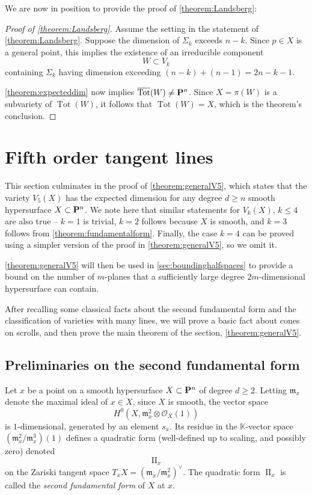 \documentclass[12pt,reqno]{amsart}
\theoremstyle{plain}
\theoremstyle{remark}
\numberwithin{equation}{section}
\renewcommand{\k}{k}
\DeclareMathOperator{\II}{II}
\DeclareMathOperator{\Tot}{Tot}
\renewcommand {\P}{{\bf P}}
\numberwithin{equation}{section}
\renewcommand{\O}{\mathcal O}
\renewcommand{\k}{\mathbb K}
\begin{document}
We are now in position to provide the proof of
\autoref{theorem:Landsberg}:

\begin{proof}[Proof of \autoref{theorem:Landsberg}]
  Assume the setting in the statement of
  \autoref{theorem:Landsberg}. Suppose the dimension of $\Sigma_{k}$
  exceeds $n-k$.  Since $p \in X$ is a general point, this implies the
  existence of an irreducible component \[W \subset V_k\] containing
  $\Sigma_{k}$ having dimension exceeding $(n-k)+(n-1) = 2n-k-1$.

  \autoref{theorem:expecteddim} now implies
  $\overline{\Tot}(W) \neq \P^{n}$. Since $X = \pi(W)$ is a subvariety
  of $\overline{\Tot}(W)$, it follows that $\overline{\Tot}(W) = X$,
  which is the theorem's conclusion.
  \end{proof}


  \section{Fifth order tangent lines}
\label{sec:quintuple-contact-lines}

This section culminates in the proof of \autoref{theorem:generalV5},
which states that the variety $V_5(X)$ has the expected dimension for
any degree $d \geq n$ smooth hypersurface $X \subset \P^{n}$.  We note
here that similar statements for $V_{k}(X)$, $k \leq 4$ are also true
-- $k=1$ is trivial, $k=2$ follows because $X$ is smooth, and $k=3$
follows from \autoref{theorem:fundamentalform}.  Finally, the case
$k=4$ can be proved using a simpler version of the proof in
\autoref{theorem:generalV5}, so we omit it.


\autoref{theorem:generalV5} will then be used in
\autoref{sec:boundinghalfspaces} to provide a bound on the number of
$m$-planes that a sufficiently large degree $2m$-dimensional
hypersurface can contain.


After recalling some classical facts about the second fundamental form
and the classification of varieties with many lines, we will prove a
basic fact about cones on scrolls, and then prove the main theorem of
the section, \autoref{theorem:generalV5}.

\subsection{Preliminaries on the second fundamental form}
\label{sec:prel-facts-about}

Let $x$ be a point on a smooth hypersurface $X \subset \P^{n}$ of
degree $d \geq 2$. Letting $\mathfrak{m}_x$ denote the maximal ideal of
$x \in X$, since $X$ is smooth, the vector space
$$H^{0}(X, \mathfrak{m}_{x}^{2}\otimes \O_{X}(1))$$ is $1$-dimensional,
generated by an element $s_x$.  Its residue in the $\k$-vector space
$\left( \mathfrak{m}_{x}^{2}/\mathfrak{m}_{x}^{3} \right)(1)$ defines a
quadratic form (well-defined up to scaling, and possibly zero) denoted
\[\II_{x}\] on the Zariski tangent space
$T_{x}X = \left(\mathfrak{m}_{x}/\mathfrak{m}_{x}^{2}\right)^{\vee}$. The
quadratic form $\II_x$ is called the {\sl second fundamental form} of
$X$ at $x$.
\end{document}
